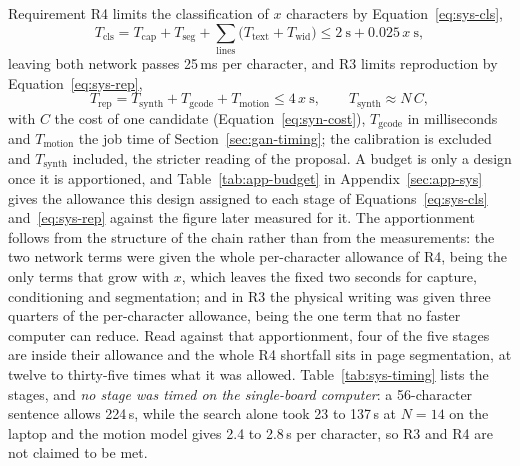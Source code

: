 Requirement R4 limits the classification of $x$ characters by Equation~\ref{eq:sys-cls},
\begin{equation}
T_{\mathrm{cls}}=T_{\mathrm{cap}}+T_{\mathrm{seg}}+\sum_{\mathrm{lines}}\bigl(T_{\mathrm{text}}+T_{\mathrm{wid}}\bigr)\le2\ \mathrm{s}+0.025\,x\ \mathrm{s},
\label{eq:sys-cls}
\end{equation}
leaving both network passes 25\,ms per character, and R3 limits reproduction by Equation~\ref{eq:sys-rep},
\begin{equation}
T_{\mathrm{rep}}=T_{\mathrm{synth}}+T_{\mathrm{gcode}}+T_{\mathrm{motion}}\le4\,x\ \mathrm{s},\qquad T_{\mathrm{synth}}\approx N\,C,
\label{eq:sys-rep}
\end{equation}
with $C$ the cost of one candidate (Equation~\ref{eq:syn-cost}), $T_{\mathrm{gcode}}$ in milliseconds and $T_{\mathrm{motion}}$ the job time of Section~\ref{sec:gan-timing}; the calibration is excluded and $T_{\mathrm{synth}}$ included, the stricter reading of the proposal.
A budget is only a design once it is apportioned, and Table~\ref{tab:app-budget} in Appendix~\ref{sec:app-sys} gives the allowance this design assigned to each stage of Equations~\ref{eq:sys-cls} and~\ref{eq:sys-rep} against the figure later measured for it.
The apportionment follows from the structure of the chain rather than from the measurements: the two network terms were given the whole per-character allowance of R4, being the only terms that grow with $x$, which leaves the fixed two seconds for capture, conditioning and segmentation; and in R3 the physical writing was given three quarters of the per-character allowance, being the one term that no faster computer can reduce.
Read against that apportionment, four of the five stages are inside their allowance and the whole R4 shortfall sits in page segmentation, at twelve to thirty-five times what it was allowed.
Table~\ref{tab:sys-timing} lists the stages, and \emph{no stage was timed on the single-board computer}: a 56-character sentence allows 224\,s, while the search alone took 23 to 137\,s at $N=14$ on the laptop and the motion model gives 2.4 to 2.8\,s per character, so R3 and R4 are not claimed to be met. 

